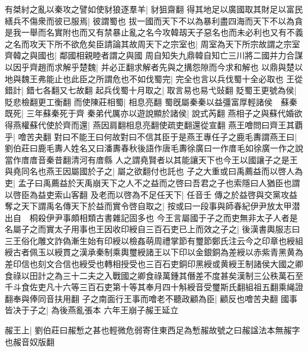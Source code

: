 有桀紂之亂以秦攻之譬如使豺狼逐羣羊|{
	豺狙齋翻
	}
得其地足以廣國取其財足以富民繕兵不傷衆而彼已服焉|{
	彼謂蜀也
	}
拔一國而天下不以為暴利盡四海而天下不以為貪是我一舉而名實附也而又有禁暴止亂之名今攻韓刼天子惡名也而未必利也又有不義之名而攻天下所不欲危矣臣請論其故周天下之宗室也|{
	周室為天下所宗故謂之宗室
	}
齊韓之與國也|{
	鄰國相親睦者謂之與國
	}
周自知失九鼎韓自知亡三川將二國并力合謀以因乎齊趙而求解乎楚魏|{
	并必正翻求解者先與之搆怨隙而今求和解也
	}
以鼎與楚以地與魏王弗能止也此臣之所謂危也不如伐蜀完|{
	完全也言以兵伐蜀十全必取也
	}
王從錯計|{
	錯七各翻又七故翻
	}
起兵伐蜀十月取之|{
	取言易也易弋䜴翻
	}
貶蜀王更號為侯|{
	貶悲檢翻更工衡翻
	}
而使陳莊相蜀|{
	相息亮翻
	}
蜀旣屬秦秦以益彊富厚輕諸侯　蘇秦既死|{
	三年蘇秦死于齊
	}
秦弟代厲亦以遊說顯於諸侯|{
	說式芮翻
	}
燕相子之與蘇代婚欲得燕權蘇代使於齊而還|{
	燕因肩翻相息亮翻使疏吏翻還從宣翻
	}
燕王噲問曰齊王其覇乎|{
	噲苦夬翻
	}
對曰不能王曰何故對曰不信其臣于是燕王專任子之鹿毛夀謂燕王曰|{
	劉伯莊曰鹿毛夀人姓名又曰潘夀春秋後語作唐毛夀徐廣曰一作庴毛如徐廣一作之說當作庴庴音秦昔翻清河有庴縣
	}
人之謂堯賢者以其能讓天下也今王以國讓子之是王與堯同名也燕王因屬國於子之|{
	屬之欲翻付也託也
	}
子之大重或曰禹薦益而以啓人為吏|{
	孟子曰禹薦益於天禹崩天下之人不之益而之啓曰吾君之子也索隱曰人猶臣也謂以啓臣為益吏索山客翻
	}
及老而以啓為不足任天下|{
	任音壬
	}
傳之於益啓與交黨攻益奪之天下謂禹名傳天下於益而實令啓自取之|{
	按或曰一段事與師春紀伊尹放太甲潜出自　桐殺伊尹事頗相類古書雜記固多也
	}
今王言屬國于子之而吏無非太子人者是名屬子之而實太子用事也王因收印綬自三百石吏已上而效之子之|{
	後漢書輿服志曰三王俗化雕文詐偽漸生始有印綬以檢姦萌周禮掌節有璽節鄭氏注云今之印章也綬組綬古者佩玉以綬貫之漢承秦制乘輿璽綬諸王以下印以金銀銅為差綬以赤紫青黑黄為差印信也刻文合信也綬受也轉相授受也三百石吏銅印黑綬或黄綬王制諸侯大國之卿食祿以田計之為三十二夫之入戰國之卿食祿萬鍾其僭差不度甚矣漢制三公秩萬石至千斗食佐吏凡十六等三百石吏第十等其奉月四十斛綬音受璽斯氏翻組祖五翻乘䋲證翻奉與俸同音扶用翻
	}
子之南面行王事而噲老不聽政顧為臣|{
	顧反也噲苦夬翻
	}
國事皆决于子之|{
	為後燕亂張本
	}
六年王崩子赧王延立

赧王上|{
	劉伯莊曰赧慙之甚也輕微危弱寄住東西足為慙赧故號之曰赧諡法本無赧字也赧音奴版翻
	}



